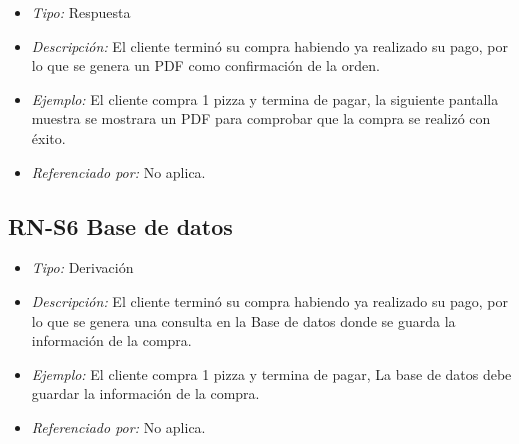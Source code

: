 \begin{itemize}
	
	\item \textit{Tipo:} Respuesta
	
	\item \textit{Descripción:} El cliente terminó su compra habiendo ya realizado su pago, por lo que se genera un PDF como confirmación de la orden.
	
	\item \textit{Ejemplo:} El cliente compra 1 pizza y termina de pagar, la siguiente pantalla muestra se mostrara un PDF para comprobar que la compra se realizó con éxito.
	
	\item \textit{Referenciado por:} No aplica.
	
\end{itemize}

	\hypertarget{RN:S6:BD}{}
\subsection{RN-S6 Base de datos}

\begin{itemize}
	
	\item \textit{Tipo:} Derivación 
	
	\item \textit{Descripción:} El cliente terminó su compra habiendo ya realizado su pago, por lo que se genera una consulta en la Base de datos donde se guarda la información de la compra.
	
	\item \textit{Ejemplo:} El cliente compra 1 pizza y termina de pagar, La base de datos debe guardar la información de la compra.
	
	\item \textit{Referenciado por:} No aplica.
	
\end{itemize}